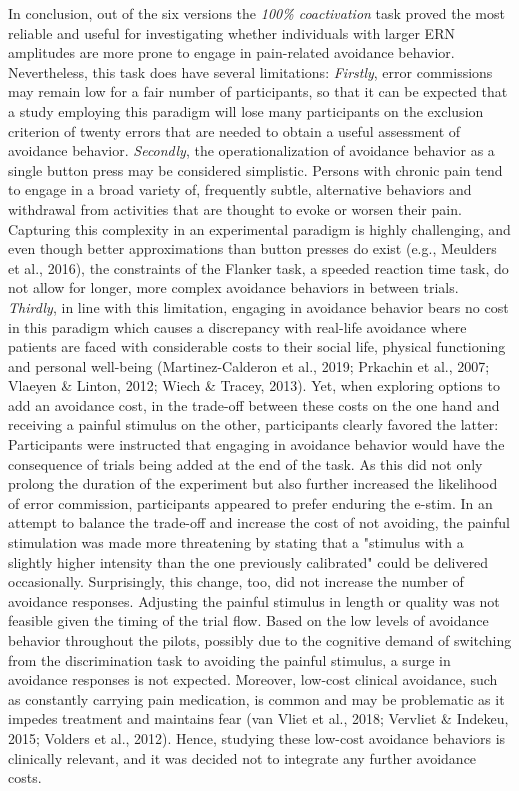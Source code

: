\documentclass[twocolumn, serif, authordate, review]{jote-article}
\begin{document}
In conclusion, out of the six versions the \textit{100\% coactivation} task proved the most reliable and useful for investigating whether individuals with larger ERN amplitudes are more prone to engage in pain-related avoidance behavior. Nevertheless, this task does have several limitations: \textit{Firstly}, error commissions may remain low for a fair number of participants, so that it can be expected that a study employing this paradigm will lose many participants on the exclusion criterion of twenty errors that are needed to obtain a useful assessment of avoidance behavior. \textit{Secondly}, the operationalization of avoidance behavior as a single button press may be considered simplistic. Persons with chronic pain tend to engage in a broad variety of, frequently subtle, alternative behaviors and withdrawal from activities that are thought to evoke or worsen their pain. Capturing this complexity in an experimental paradigm is highly challenging, and even though better approximations than button presses do exist (e.g., Meulders et al., 2016), the constraints of the Flanker task, a speeded reaction time task, do not allow for longer, more complex avoidance behaviors in between trials. \textit{Thirdly}, in line with this limitation, engaging in avoidance behavior bears no cost in this paradigm which causes a discrepancy with real-life avoidance where patients are faced with considerable costs to their social life, physical functioning and personal well-being (Martinez-Calderon et al., 2019; Prkachin et al., 2007; Vlaeyen \& Linton, 2012; Wiech \& Tracey, 2013). Yet, when exploring options to add an avoidance cost, in the trade-off between these costs on the one hand and receiving a painful stimulus on the other, participants clearly favored the latter: Participants were instructed that engaging in avoidance behavior would have the consequence of trials being added at the end of the task. As this did not only prolong the duration of the experiment but also further increased the likelihood of error commission, participants appeared to prefer enduring the e-stim. In an attempt to balance the trade-off and increase the cost of not avoiding, the painful stimulation was made more threatening by stating that a "stimulus with a slightly higher intensity than the one previously calibrated" could be delivered occasionally. Surprisingly, this change, too, did not increase the number of avoidance responses. Adjusting the painful stimulus in length or quality was not feasible given the timing of the trial flow. Based on the low levels of avoidance behavior throughout the pilots, possibly due to the cognitive demand of switching from the discrimination task to avoiding the painful stimulus, a surge in avoidance responses is not expected. Moreover, low-cost clinical avoidance, such as constantly carrying pain medication, is common and may be problematic as it impedes treatment and maintains fear (van Vliet et al., 2018; Vervliet \& Indekeu, 2015; Volders et al., 2012). Hence, studying these low-cost avoidance behaviors is clinically relevant, and it was decided not to integrate any further avoidance costs.
\end{document}
